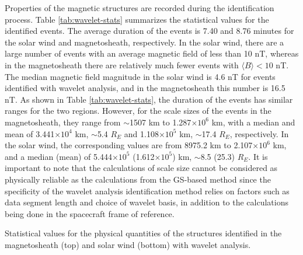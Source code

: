 Properties of the magnetic structures are recorded during the identification process. Table \ref{tab:wavelet-stats} summarizes the statistical values for the identified events. The average duration of the events is 7.40 and 8.76 minutes for the solar wind and magnetosheath, respectively. In the solar wind, there are a large number of events with an average magnetic field of less than 10 nT, whereas in the magnetosheath there are relatively much fewer events with $\langle B\rangle < 10$ nT. The median magnetic field magnitude in the solar wind is 4.6 nT for events identified with wavelet analysis, and in the magnetosheath this number is 16.5 nT. As shown in Table \ref{tab:wavelet-stats}, the duration of the events has similar ranges for the two regions. However, for the scale sizes of the events in the magnetosheath, they range from $\sim$1507 km to 1.287$\times 10^6$ km, with a median and mean of 3.441$\times 10^4$ km, $\sim$5.4 $R_E$ and 1.108$\times 10^5$ km, $\sim$17.4 $R_E$, respectively. In the solar wind, the corresponding values are from 8975.2 km to 2.107$\times 10^6$ km, and a median (mean) of 5.444$\times 10^5$ (1.612$\times 10^5$) km, $\sim$8.5 (25.3) $R_E$. It is important to note that the calculations of scale size cannot be considered as physically reliable as the calculations from the GS-based method since the specificity of the wavelet analysis identification method relies on factors such as data segment length and choice of wavelet basis, in addition to the calculations being done in the spacecraft frame of reference.
\begin{table}
    \centering
    \caption[Statistical values for the physical quantities of structures identified with wavelet analysis]{Statistical values for the physical quantities of the structures identified in the magnetosheath (top) and solar wind (bottom) with wavelet analysis.}
    
    \label{tab:wavelet-stats}
\end{table}

